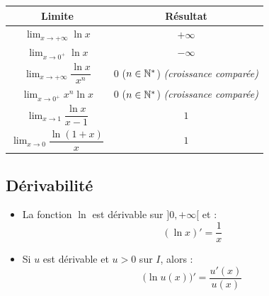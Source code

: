 \begin{propriete}
  \bigskip
  \begin{center}
  \renewcommand{\arraystretch}{2}
  \begin{tabular}{|c|c|}
    \hline
    \textbf{\color{navy}Limite}
      & \textbf{\color{navy}R\'{e}sultat} \\
    \hline\hline
    $\displaystyle\lim_{x \to +\infty} \ln x$
      & $+\infty$ \\
    \hline
    $\displaystyle\lim_{x \to 0^+} \ln x$
      & $-\infty$ \\
    \hline
    $\displaystyle\lim_{x \to +\infty} \dfrac{\ln x}{x^n}$
      & $0$ \quad ($n \in \mathbb{N}^*$) \quad \textit{(croissance compar\'{e}e)} \\
    \hline
    $\displaystyle\lim_{x \to 0^+} x^n \ln x$
      & $0$ \quad ($n \in \mathbb{N}^*$) \quad \textit{(croissance compar\'{e}e)} \\
    \hline
    $\displaystyle\lim_{x \to 1} \dfrac{\ln x}{x - 1}$
      & $1$ \\
    \hline
    $\displaystyle\lim_{x \to 0} \dfrac{\ln(1+x)}{x}$
      & $1$ \\
    \hline
  \end{tabular}
  \end{center}
\end{propriete}

\subsection{D\'{e}rivabilit\'{e}}

\begin{propriete}[D\'{e}riv\'{e}e de $\ln x$ et de $\ln u(x)$]
  \begin{itemize}
    \item La fonction $\ln$ est d\'{e}rivable sur $]0,+\infty[$ et :
    \[
      (\ln x)' = \frac{1}{x}
    \]
    \item Si $u$ est d\'{e}rivable et $u > 0$ sur $I$, alors :
    \[
      \bigl(\ln u(x)\bigr)' = \frac{u'(x)}{u(x)}
    \]
  \end{itemize}
\end{propriete}

